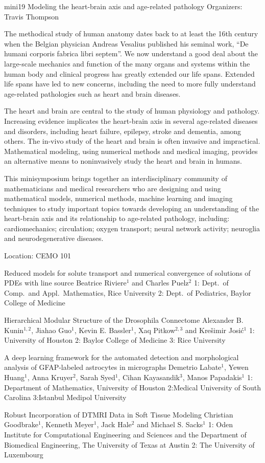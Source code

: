 \mini
{mini19}
{Modeling the heart-brain axis and age-related pathology}
{Organizers: Travis Thompson}
{The methodical study of human anatomy dates back to at least the 16th century when the Belgian physician Andreas Vesalius published his seminal work, ``De humani corporis fabrica libri septem''.  We now understand a good deal about the large-scale mechanics and function of the many organs and systems within the human body and clinical progress has greatly extended our life spans.  Extended life spans have led to new concerns, including the need to more fully understand age-related pathologies such as heart and brain diseases.

The heart and brain are central to the study of human physiology and pathology.  Increasing evidence implicates the heart-brain axis in several age-related diseases and disorders, including heart failure, epilepsy, stroke and dementia, among others.  The in-vivo study of the heart and brain is often invasive and impractical.  Mathematical modeling, using numerical methods and medical imaging, provides an alternative means to noninvasively study the heart and brain in humans.

This minisymposium brings together an interdisciplinary community of mathematicians and medical researchers who are designing and using mathematical models, numerical methods, machine learning and imaging techniques to study important topics towards developing an understanding of the heart-brain axis and its relationship to age-related pathology, including: cardiomechanics; circulation; oxygen transport; neural network activity; neuroglia and neurodegenerative diseases.}
{Location: CEMO 101}

\begin{talks}
\item\talk
{Reduced models for solute transport and numerical convergence of solutions of PDEs with line source}
{Beatrice Riviere$^{1}$ and Charles Puelz$^{2}$}
{1: Dept.~of Comp.~and Appl.~Mathematics, Rice University 2: Dept.~of Pediatrics, Baylor College of Medicine}
\item\talk
{Hierarchical Modular Structure of the Drosophila Connectome}
{Alexander B. Kunin$^{1,2}$, Jiahao Guo$^{1}$, Kevin E. Bassler$^{1}$, Xaq Pitkow$^{2,3}$ and Krešimir Josić$^{1}$ }
{1: University of Houston 2: Baylor College of Medicine 3: Rice University}
\item\talk
{A deep learning framework for the automated detection and morphological analysis of GFAP-labeled astrocytes in micrographs}
{Demetrio Labate$^{1}$, Yewen Huang$^{1}$, Anna Kruyer$^{2}$, Sarah Syed$^{1}$, Cihan Kayasandik$^{3}$, Manos Papadakis$^{1}$}
{1: Department of Mathematics, University of Houston 2:Medical University of South Carolina 3:Istanbul Medipol University}
\item\talk
{Robust Incorporation of DTMRI Data in Soft Tissue Modeling}
{Christian Goodbrake$^{1}$, Kenneth Meyer$^{1}$, Jack Hale$^{2}$ and Michael S. Sacks$^{1}$}
{1: Oden Institute for Computational Engineering and Sciences and the Department of Biomedical Engineering, The University of Texas at Austin 2: The University of Luxembourg}
\end{talks}
\room
